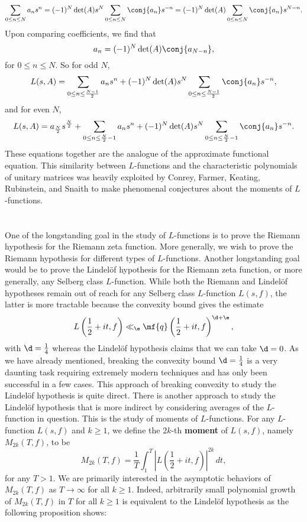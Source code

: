       \[
        \sum_{0 \le n \le N}a_{n}s^{n} = (-1)^{N}\det(A)s^{N}\sum_{0 \le n \le N}\conj{a_{n}}s^{-n} = (-1)^{N}\det(A)\sum_{0 \le n \le N}\conj{a_{n}}s^{N-n}.
      \]
      Upon comparing coefficients, we find that
      \[
        a_{n} = (-1)^{N}\det(A)\conj{a_{N-n}},
      \]
      for $0 \le n \le N$. So for odd $N$,
      \[
        L(s,A) = \sum_{0 \le n \le \frac{N-1}{2}}a_{n}s^{n}+(-1)^{N}\det(A)s^{N}\sum_{0 \le n \le \frac{N-1}{2}}\conj{a_{n}}s^{-n},
      \]
      and for even $N$,
      \[
        L(s,A) = a_{\frac{N}{2}}s^{\frac{N}{2}}+\sum_{0 \le n \le \frac{N}{2}-1}a_{n}s^{n}+(-1)^{N}\det(A)s^{N}\sum_{0 \le n \le \frac{N}{2}-1}\conj{a_{n}}s^{-n}.
      \]
      These equations together are the analogue of the approximate functional equation. This similarity between $L$-functions and the characteristic polynomials of unitary matrices was heavily exploited by Conrey, Farmer, Keating, Rubinstein, and Snaith to make phenomenal conjectures about the moments of $L$-functions.
  \section{}
    One of the longstanding goal in the study of $L$-functions is to prove the Riemann hypothesis for the Riemann zeta function. More generally, we wish to prove the Riemann hypothesis for different types of $L$-functions. Another longstanding goal would be to prove the Lindel\"of hypothesis for the Riemann zeta function, or more generally, any Selberg class $L$-function. While both the Riemann and Lindel\"of hypotheses remain out of reach for any Selberg class $L$-function $L(s,f)$, the latter is more tractable because the convexity bound gives the estimate
    \[
      L\left(\frac{1}{2}+it,f\right) \ll_{\e} \mf{q}\left(\frac{1}{2}+it,f\right)^{\d+\e},
    \]
    with $\d = \frac{1}{4}$ whereas the Lindel\"of hypothesis claims that we can take $\d = 0$. As we have already mentioned, breaking the convexity bound $\d = \frac{1}{4}$ is a very daunting task requiring extremely modern techniques and has only been successful in a few cases. This approach of breaking convexity to study the Lindel\"of hypothesis is quite direct. There is another approach to study the Lindel\"of hypothesis that is more indirect by considering averages of the $L$-function in question. This is the study of moments of $L$-functions. For any $L$-function $L(s,f)$ and $k \ge 1$, we define the $2k$-th \textbf{moment} of $L(s,f)$, namely $M_{2k}(T,f)$, to be
    \[
      M_{2k}(T,f) = \frac{1}{T}\int_{1}^{T}\left|L\left(\frac{1}{2}+it,f\right)\right|^{2k}\,dt,
    \]
    for any $T > 1$. We are primarily interested in the asymptotic behaviors of $M_{2k}(T,f)$ as $T \to \infty$ for all $k \ge 1$. Indeed, arbitrarily small polynomial growth of $M_{2k}(T,f)$ in $T$ for all $k \ge 1$ is equivalent to the Lindel\"of hypothesis as the following proposition shows:

